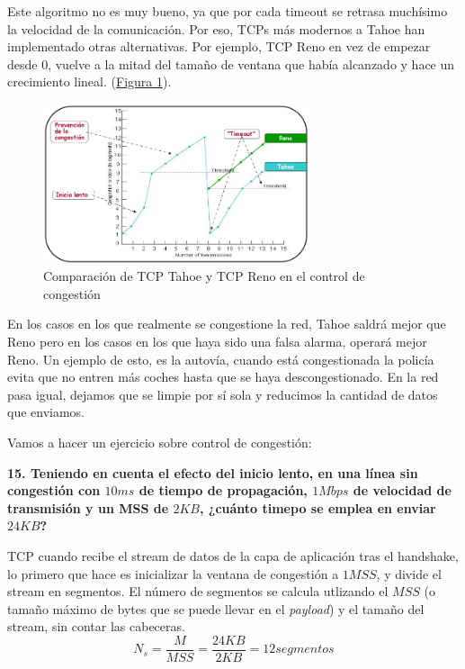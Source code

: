 \documentclass[10pt,a4paper,spanish]{report}
\begin{document}
Este algoritmo no es muy bueno, ya que por cada timeout se retrasa muchísimo la velocidad de la comunicación. Por eso, TCPs más modernos a Tahoe han implementado otras alternativas. Por ejemplo, TCP Reno en vez de empezar desde 0, vuelve a la mitad del tamaño de ventana que había alcanzado y hace un crecimiento lineal. (\hyperref[tahoereno]{Figura \ref*{tahoereno}}). 

\begin{figure}
  \centering
  \includegraphics[width=0.7\textwidth]{tahoereno}
  \caption{Comparación de TCP Tahoe y TCP Reno en el control de congestión}
  \label{tahoereno}
\end{figure}

En los casos en los que realmente se congestione la red, Tahoe saldrá mejor que Reno pero en los casos en los que haya sido una falsa alarma, operará mejor Reno. Un ejemplo de esto, es la autovía, cuando está congestionada la policía evita que no entren más coches hasta que se haya descongestionado. En la red pasa igual, dejamos que se limpie por sí sola y reducimos la cantidad de datos que enviamos.

Vamos a hacer un ejercicio sobre control de congestión:

\textbf{15. Teniendo en cuenta el efecto del inicio lento, en una línea sin congestión con $10 ms$ de tiempo de propagación, $1 Mbps$ de velocidad de transmisión y un MSS de $2KB$, ¿cuánto timepo se emplea en enviar $24KB$?}

TCP cuando recibe el stream de datos de la capa de aplicación tras el handshake, lo primero que hace es inicializar la ventana de congestión a $1 MSS$, y divide el stream en segmentos. El número de segmentos se calcula utlizando el $MSS$ (o tamaño máximo de bytes que se puede llevar en el \textit{\textcolor{tema3}{payload}}) y el tamaño del stream, sin contar las cabeceras.
\begin{displaymath}
    N_s = \frac{M}{MSS} = \frac{24KB}{2KB} = 12 segmentos
\end{displaymath}
\end{document}
